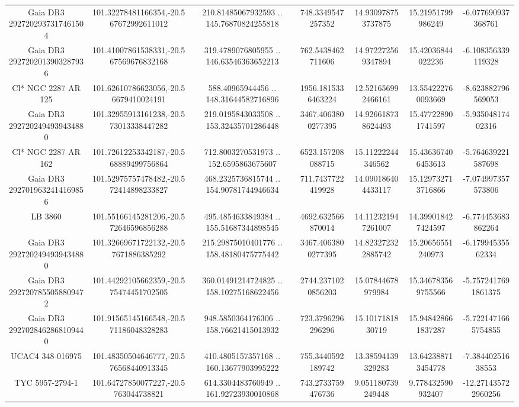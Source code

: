 \begin{table}
\begin{tabular}{ccccccc}
Gaia DR3 2927202937317461504 & 101.32278481166354,-20.567672992611012 & 210.81485067932593 .. 145.76870824255818 & 748.3349547257352 & 14.930978753737875 & 15.21951799986249 & -6.077690937368761 \\
Gaia DR3 2927202013903287936 & 101.41007861538331,-20.567569676832168 & 319.4789076805955 .. 146.63546363652213 & 762.5438462711606 & 14.972272569347894 & 15.42036844022236 & -6.108356339119328 \\
Cl* NGC 2287     AR     125 & 101.62610786623056,-20.56679410024191 & 588.40965944456 .. 148.31644582716896 & 1956.1815336463224 & 12.521656992466161 & 13.554222760093669 & -8.623882796569053 \\
Gaia DR3 2927202494939434880 & 101.32955913161238,-20.573013338447282 & 219.0195843033508 .. 153.32435701286448 & 3467.4063800277395 & 14.926618738624493 & 15.477228901741597 & -5.93504817402316 \\
Cl* NGC 2287     AR     162 & 101.72612253342187,-20.568889499756864 & 712.8003270531973 .. 152.6595863675607 & 6523.157208088715 & 15.11222244346562 & 15.436367406453613 & -5.764639221587698 \\
Gaia DR3 2927019632414169856 & 101.52975757478482,-20.572414898233827 & 468.2325736815744 .. 154.90781744946634 & 711.7437722419928 & 14.090186404433117 & 15.129732713716866 & -7.074997357573806 \\
LB  3860 & 101.55166145281206,-20.572646596856288 & 495.4854633849384 .. 155.51687344898545 & 4692.632566870014 & 14.112321947261007 & 14.399018427424597 & -6.774453683862264 \\
Gaia DR3 2927202494939434880 & 101.32669671722132,-20.57671886385292 & 215.29875010401776 .. 158.48180475775442 & 3467.4063800277395 & 14.823272322885742 & 15.20656551240973 & -6.17994535562334 \\
Gaia DR3 2927207855058809472 & 101.44292105662359,-20.575474451702505 & 360.01491214724825 .. 158.10275168622456 & 2744.2371020856203 & 15.07844678979984 & 15.346783569755566 & -5.7572417691861375 \\
Gaia DR3 2927028462868109440 & 101.91565145166548,-20.571186048328283 & 948.5850364176306 .. 158.76621415013932 & 723.3796296296296 & 15.1017181830719 & 15.948428661837287 & -5.7221471665754855 \\
UCAC4 348-016975 & 101.48350504646777,-20.576568440913345 & 410.4805157357168 .. 160.13677903995222 & 755.3440592189742 & 13.38594139329283 & 13.642388713454778 & -7.38440251638553 \\
TYC 5957-2794-1 & 101.64727850077227,-20.5763044738821 & 614.3304483760949 .. 161.92723930010868 & 743.2733759476736 & 9.051180739249448 & 9.778432590932407 & -12.271435722960256 \\

\end{tabular}
\end{table}
